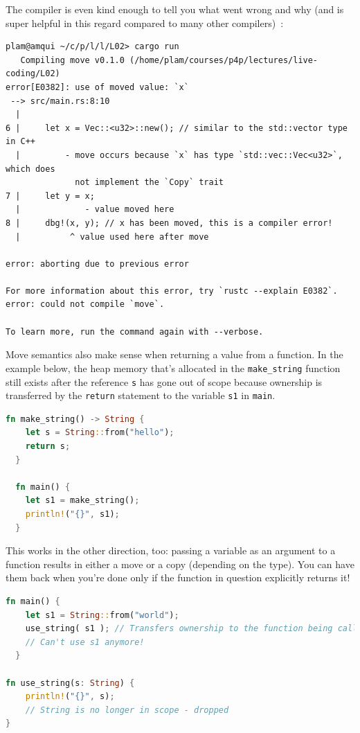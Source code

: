 The compiler is even kind enough to tell you what went wrong and why (and is super helpful in this regard compared to many other compilers)~\cite{rustdocs}:
\begin{verbatim}
plam@amqui ~/c/p/l/l/L02> cargo run
   Compiling move v0.1.0 (/home/plam/courses/p4p/lectures/live-coding/L02)
error[E0382]: use of moved value: `x`
 --> src/main.rs:8:10
  |
6 |     let x = Vec::<u32>::new(); // similar to the std::vector type in C++
  |         - move occurs because `x` has type `std::vec::Vec<u32>`, which does 
              not implement the `Copy` trait
7 |     let y = x;
  |             - value moved here
8 |     dbg!(x, y); // x has been moved, this is a compiler error!
  |          ^ value used here after move

error: aborting due to previous error

For more information about this error, try `rustc --explain E0382`.
error: could not compile `move`.

To learn more, run the command again with --verbose.
\end{verbatim}

Move semantics also make sense when returning a value from a function. In the example below, the heap memory that's allocated in the \texttt{make\_string} function still exists after the reference \texttt{s} has gone out of scope because ownership is transferred by the \texttt{return} statement to the variable \texttt{s1} in \texttt{main}.

\begin{lstlisting}[language=Rust]
  fn make_string() -> String {
    let s = String::from("hello");
    return s;
  }

  fn main() {
    let s1 = make_string();
    println!("{}", s1);
  }
\end{lstlisting}

This works in the other direction, too: passing a variable as an argument to a function results in either a move or a copy (depending on the type). You can have them back when you're done only if the function in question explicitly returns it! 

\begin{lstlisting}[language=Rust]
  fn main() {
    let s1 = String::from("world");
	use_string( s1 ); // Transfers ownership to the function being called
	// Can't use s1 anymore!
  }
  
fn use_string(s: String) {
    println!("{}", s); 
    // String is no longer in scope - dropped
}
\end{lstlisting}

